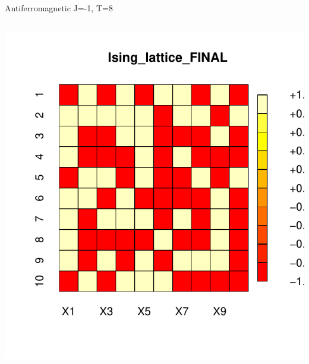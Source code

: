 \documentclass{beamer}
\begin{document}
\begin{frame}{Antiferromagnetic J=-1, T=8}
\begin{columns}
\begin{column}{0.5\textwidth}
\begin{center}
     \includegraphics[width=\textwidth]{Pic/J-1_60_2500_T=8_FINAL.pdf}
     \end{center}
\end{column}
\end{columns}
\end{frame}
\end{document}
